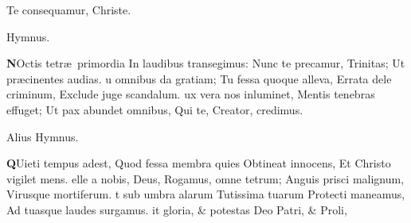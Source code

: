\documentclass[letter,11pt]{book}
\begin{document}
\begin{multicols*}{2}
\newline \indent Te consequamur, Christe.
\vspace{-.5em} \begin{center} \color{Red} Hymnus. \end{center} \vspace{-.5em}
\lettrine[lines=2]{\bfseries \color{Red} N}{}Octis tetr\ae \ primordia
\newline In laudibus transegimus:
\newline \indent Nunc te precamur, Trinitas;
\newline \indent Ut pr\ae cinentes audias.
u omnibus da gratiam;
\newline \indent Tu fessa quoque alleva,
\newline \indent Errata dele criminum,
\newline \indent Exclude juge scandalum.
ux vera nos inluminet,
\newline \indent Mentis tenebras effuget;
\newline \indent Ut pax abundet omnibus,
\newline \indent Qui te, Creator, credimus.
\vspace{-.5em} \begin{center} \color{Red} Alius Hymnus. \end{center} \vspace{-.5em}
\lettrine[lines=2]{\bfseries \color{Red} Q}{}Uieti tempus adest,
\newline Quod fessa membra quies
\newline \indent Obtineat innocens,
\newline \indent Et Christo vigilet mens.
elle a nobis, Deus,
\newline \indent Rogamus, omne tetrum;
\newline \indent Anguis prisci malignum,
\newline \indent Virusque mortiferum.
t sub umbra alarum
\newline \indent Tutissima tuarum
\newline \indent Protecti maneamus,
\newline \indent Ad tuasque laudes surgamus.
it gloria, \& potestas
\newline \indent Deo Patri, \& Proli,

\end{multicols*}
\end{document}
